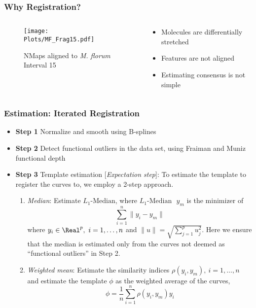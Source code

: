 \documentclass[10pt,dvipsnames,table]{beamer}
\begin{document}
\begin{frame}
\frametitle{Why Registration?}
\begin{columns}
\begin{column}{0.5\textwidth}
\begin{figure}[H]
\begin{center}
\texttt{[image: Plots/MF\_Frag15.pdf]}
\end{center}
\caption{NMaps aligned to {\emph{M. florum}} Interval 15}
\end{figure}
\end{column}
\begin{column}{0.5\textwidth}
\begin{itemize}
\item Molecules are differentially stretched
\item Features are not aligned
\item Estimating consensus is not simple
\end{itemize}
\end{column}
\end{columns}
\end{frame}

\begin{frame}
\frametitle{Estimation: Iterated Registration}
\begin{itemize}
\item {\bf{Step 1}} Normalize and smooth using B-splines
\item {\bf{Step 2}} Detect functional outliers in the data set, using Fraiman and Muniz functional depth
\item {\bf{Step 3}} Template estimation [{\emph{Expectation step}}]: To estimate the template to register the curves to, we employ a 2-step approach. 
\begin{enumerate}
\item {\emph{Median}}: Estimate $L_1\text{-Median}$, where $L_1\text{-Median }$ $y_m$ is the minimizer of 
\[ \sum\limits_{i = 1}^n \|y_i - y_m \| \]
where $y_i \in \Real^p, \ i = 1,\dots,n$ and $\|u \| = \sqrt{\sum\limits_{j = 1}^p u_j^2}$. Here we ensure that the median is estimated only from the curves not deemed as ``functional outliers'' in Step 2. 
\item {\emph{Weighted mean}}: Estimate the similarity indices $\rho(y_i, y_m), \ i = 1,\dots,n$ and estimate the template $\phi$ as the weighted average of the curves, 
\[ \phi = \frac{1}{n}\sum\limits_{i = 1}^n \rho(y_i, y_m) y_i \]
\end{enumerate}
\end{itemize}
\end{frame}
\end{document}
